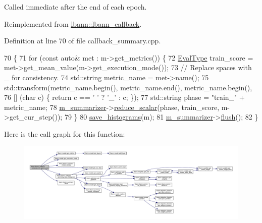 Called immediate after the end of each epoch. 

Reimplemented from \hyperlink{classlbann_1_1lbann__callback_a1fc71110e7f754bf73c9e0f344a448a5}{lbann\+::lbann\+\_\+callback}.



Definition at line 70 of file callback\+\_\+summary.\+cpp.


\begin{DoxyCode}
70                                                   \{
71   \textcolor{keywordflow}{for} (\textcolor{keyword}{const} \textcolor{keyword}{auto}& met : m->get\_metrics()) \{
72     \hyperlink{base_8hpp_a3266f5ac18504bbadea983c109566867}{EvalType} train\_score = met->get\_mean\_value(m->get\_execution\_mode());
73     \textcolor{comment}{// Replace spaces with \_ for consistency.}
74     std::string metric\_name = met->name();
75     std::transform(metric\_name.begin(), metric\_name.end(), metric\_name.begin(),
76                    [] (\textcolor{keywordtype}{char} c) \{ \textcolor{keywordflow}{return} c == \textcolor{charliteral}{' '} ? \textcolor{charliteral}{'\_'} : c; \});
77     std::string phase = \textcolor{stringliteral}{"train\_"} + metric\_name;
78     \hyperlink{classlbann_1_1lbann__callback_a277d46138184f85f161a8263b8322c76}{m\_summarizer}->\hyperlink{classlbann_1_1lbann__summary_a3e0b9aae1f80403a195567fd25ea2525}{reduce\_scalar}(phase, train\_score, m->get\_cur\_step());
79   \}
80   \hyperlink{classlbann_1_1lbann__callback__summary_a72a46c51527a02516584ce1e49e5cd29}{save\_histograms}(m);
81   \hyperlink{classlbann_1_1lbann__callback_a277d46138184f85f161a8263b8322c76}{m\_summarizer}->\hyperlink{classlbann_1_1lbann__summary_afca72ec49f3e813b6563285a2153a5be}{flush}();
82 \}
\end{DoxyCode}
Here is the call graph for this function\+:\nopagebreak
\begin{figure}[H]
\begin{center}
\leavevmode
\includegraphics[width=350pt]{classlbann_1_1lbann__callback__summary_a404e64dcedfcba611510379f99dcace9_cgraph}
\end{center}
\end{figure}
